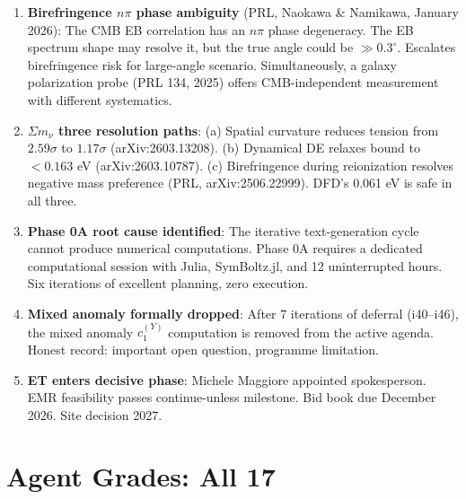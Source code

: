\documentclass[11pt,a4paper]{article}
\begin{document}
\begin{enumerate}
\item \textbf{Birefringence $n\pi$ phase ambiguity} (PRL, Naokawa \& Namikawa, January 2026): The CMB EB correlation has an $n\pi$ phase degeneracy. The EB spectrum shape may resolve it, but the true angle could be $\gg 0.3^\circ$. Escalates birefringence risk for large-angle scenario. Simultaneously, a galaxy polarization probe (PRL 134, 2025) offers CMB-independent measurement with different systematics.

\item \textbf{$\Sigma m_\nu$ three resolution paths}: (a) Spatial curvature reduces tension from $2.59\sigma$ to $1.17\sigma$ (arXiv:2603.13208). (b) Dynamical DE relaxes bound to $< 0.163$ eV (arXiv:2603.10787). (c) Birefringence during reionization resolves negative mass preference (PRL, arXiv:2506.22999). DFD's 0.061 eV is safe in all three.

\item \textbf{Phase 0A root cause identified}: The iterative text-generation cycle cannot produce numerical computations. Phase 0A requires a dedicated computational session with Julia, SymBoltz.jl, and 12 uninterrupted hours. Six iterations of excellent planning, zero execution.

\item \textbf{Mixed anomaly formally dropped}: After 7 iterations of deferral (i40--i46), the mixed anomaly $c_1^{(Y)}$ computation is removed from the active agenda. Honest record: important open question, programme limitation.

\item \textbf{ET enters decisive phase}: Michele Maggiore appointed spokesperson. EMR feasibility passes continue-unless milestone. Bid book due December 2026. Site decision 2027.
\end{enumerate}


\part{Agent Grades: All 17}
\end{document}

